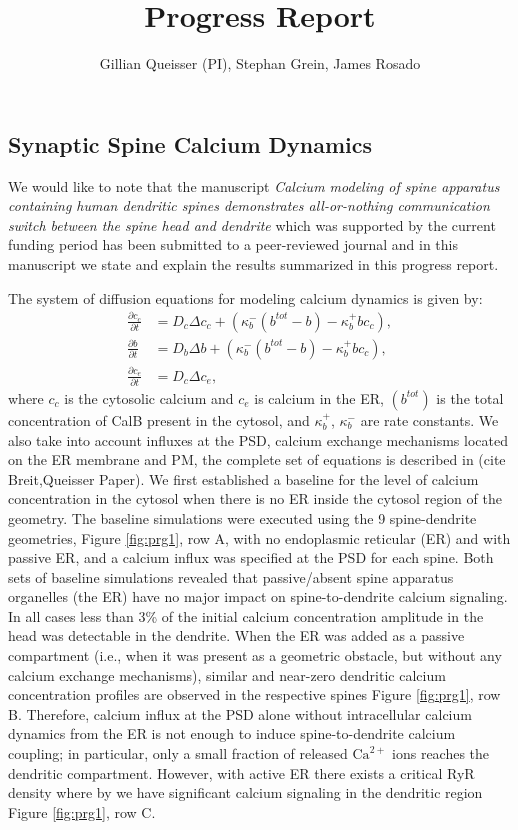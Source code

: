 \documentclass[10pt, letterpaper]{article}
\author{Gillian Queisser (PI), Stephan Grein, James Rosado}
\title{\vspace{-2cm}Progress Report}
\date{\vspace{-1cm}}
\begin{document}
\maketitle

\subsection*{Synaptic Spine Calcium Dynamics}
We would like to note that the manuscript \textit{Calcium modeling of spine apparatus containing human dendritic spines demonstrates all-or-nothing communication switch between the spine head and dendrite} which was supported by the current funding period has been submitted to a peer-reviewed journal and in this manuscript we state and explain the results summarized in this progress report.

The system of diffusion equations \cite{Breit2018} for modeling calcium dynamics is given by:
\begin{align}
    \frac{\partial c_c}{\partial t} &= D_c\Delta c_c + (\kappa_b^-(b^{tot}-b)-\kappa_b^+bc_c),\\
    \frac{\partial b}{\partial t} &= D_b\Delta b + (\kappa_b^-(b^{tot}-b)-\kappa_b^+bc_c),\\
    \frac{\partial c_e}{\partial t} &= D_c\Delta c_e, 
\end{align}
where $c_c$ is the cytosolic calcium and $c_e$ is calcium in the ER, $(b^{tot})$ is the total concentration of CalB present in the cytosol, and $\kappa_b^+$, $\kappa_b^-$ are rate constants. We also take into account influxes at the PSD, calcium exchange mechanisms located on the ER membrane and PM, the complete set of equations is described in (cite Breit,Queisser Paper). We first established a baseline for the level of calcium concentration in the cytosol when there is no ER inside the cytosol region of the geometry. The baseline simulations were executed using the 9 spine-dendrite geometries,  Figure \ref{fig:prg1}, row A, with no endoplasmic reticular (ER) and with passive ER, and a calcium influx was specified at the PSD for each spine. Both sets of baseline simulations revealed that passive/absent spine apparatus organelles (the ER) have no major impact on spine-to-dendrite calcium signaling. In all cases less than 3\%  of the initial calcium concentration amplitude in the head was detectable in the dendrite. When the ER was added as a passive compartment (i.e., when it was present as a geometric obstacle, but without any calcium exchange mechanisms), similar and near-zero dendritic calcium concentration profiles are observed in the respective spines Figure \ref{fig:prg1}, row B. Therefore, calcium influx at the PSD alone without intracellular calcium dynamics from the ER is not enough to induce spine-to-dendrite calcium coupling; in particular, only a small fraction of released $\textrm{Ca}^{2+}$ ions reaches the dendritic compartment. However, with active ER there exists a critical RyR density where by we have significant calcium signaling in the dendritic region Figure \ref{fig:prg1}, row C.
\end{document}
